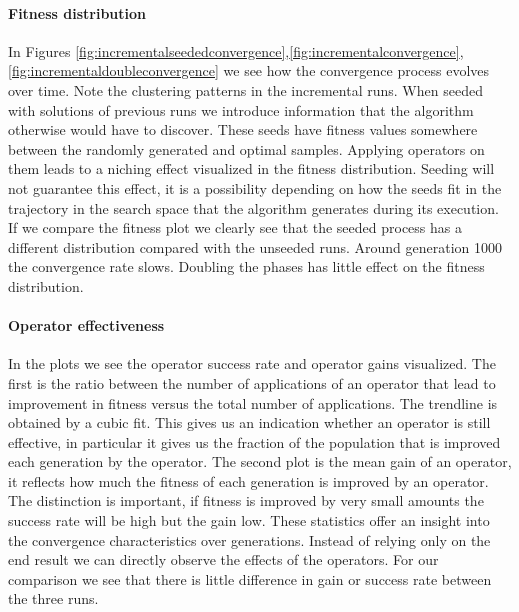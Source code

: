 \paragraph{Fitness distribution}
In Figures \ref{fig:incrementalseededconvergence},\ref{fig:incrementalconvergence},\ref{fig:incrementaldoubleconvergence} we see how the convergence process evolves over time. 
Note the clustering patterns in the incremental runs. When seeded with solutions of previous runs we introduce information that the algorithm otherwise would have to discover. These seeds have fitness values somewhere between the randomly generated and optimal samples. Applying operators on them leads to a niching effect visualized in the fitness distribution. Seeding will not guarantee this effect, it is a possibility depending on how the seeds fit in the trajectory in the search space that the algorithm generates during its execution.
If we compare the fitness plot we clearly see that the seeded process has a different distribution compared with the unseeded runs. Around generation 1000 the convergence rate slows. Doubling the phases has little effect on the fitness distribution. 
\paragraph{Operator effectiveness}
In the plots we see the operator success rate and operator gains visualized. The first is the ratio between the number of applications of an operator that lead to improvement in fitness versus the total number of applications. The trendline is obtained by a cubic fit. This gives us an indication whether an operator is still effective, in particular it gives us the fraction of the population that is improved each generation by the operator. The second plot is the mean gain of an operator, it reflects how much the fitness of each generation is improved by an operator. The distinction is important, if fitness is improved by very small amounts the success rate will be high but the gain low. These statistics offer an insight into the convergence characteristics over generations. Instead of relying only on the end result we can directly observe the effects of the operators. For our comparison we see that there is little difference in gain or success rate between the three runs.
